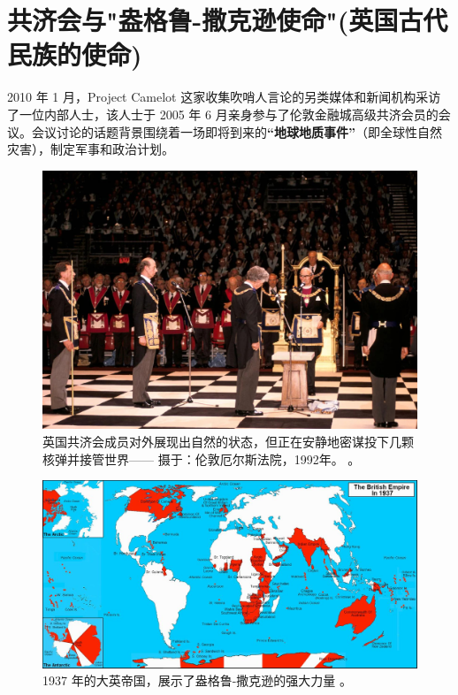 \documentclass[10pt,twocolumn,letterpaper]{article}
\begin{document}
\section{共济会与"盎格鲁-撒克逊使命"(英国古代民族的使命)}

2010 年 1 月，Project Camelot 这家收集吹哨人言论的另类媒体和新闻机构采访了\cite{4,6}一位内部人士，该人士于 2005 年 6 月亲身参与了伦敦金融城高级共济会员的会议。会议讨论的话题背景围绕着一场即将到来的\textbf{“地球地质事件”}（即全球性自然灾害），制定军事和政治计划。

\begin{figure}[b]
\begin{center}
   \includegraphics[width=1\linewidth]{freemason.jpg}

\end{center}
   \caption{英国共济会成员对外展现出自然的状态，但正在安静地密谋投下几颗核弹并接管世界—— 摄于：伦敦厄尔斯法院，1992年。 \cite{5}。}
\label{fig:1}
\label{fig:onecol}
\end{figure}

\begin{figure}[t]
\begin{center}
\includegraphics[width=1\textwidth]{british.jpg}
\end{center}
   \caption{1937 年的大英帝国，展示了盎格鲁-撒克逊的强大力量 \cite{14}。}
   \label{fig:2}
\end{figure}
\end{document}
